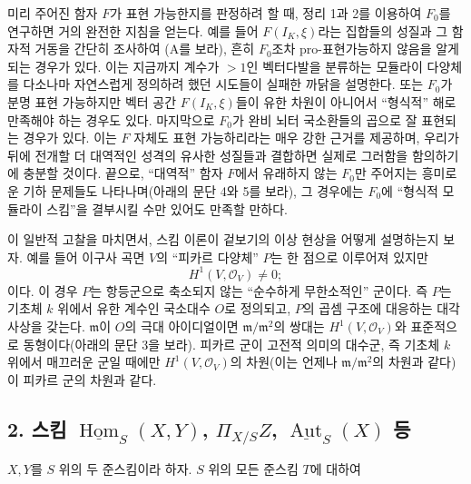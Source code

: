 미리 주어진 함자 $F$가 표현 가능한지를 판정하려 할 때, 정리 1과 2를
이용하여 $F_0$를 연구하면 거의 완전한 지침을 얻는다. 예를 들어
$F(I_K,\xi)$라는 집합들의 성질과 그 함자적 거동을 간단히 조사하여
(A를 보라), 흔히 $F_0$조차 pro-표현가능하지 않음을 알게 되는 경우가
있다. 이는 지금까지 계수가 $>1$인 벡터다발을 분류하는 모듈라이 다양체를
다소나마 자연스럽게 정의하려 했던 시도들이 실패한 까닭을 설명한다.
또는 $F_0$가 분명 표현 가능하지만 벡터 공간 $F(I_K,\xi)$들이 유한
차원이 아니어서 ``형식적'' 해로 만족해야 하는 경우도 있다. 마지막으로
$F_0$가 완비 뇌터 국소환들의 곱으로 잘 표현되는 경우가 있다. 이는 $F$
자체도 표현 가능하리라는 매우 강한 근거를 제공하며, 우리가 뒤에 전개할
더 대역적인 성격의 유사한 성질들과 결합하면 실제로 그러함을 함의하기에
충분할 것이다. 끝으로, ``대역적'' 함자 $F$에서 유래하지 않는 $F_0$만
주어지는 흥미로운 기하 문제들도 나타나며(아래의 문단 4와 5를 보라),
그 경우에는 $F_0$에 ``형식적 모듈라이 스킴''을 결부시킬 수만 있어도
만족할 만하다.

이 일반적 고찰을 마치면서, 스킴 이론이 겉보기의 이상 현상을 어떻게
설명하는지 보자. 예를 들어 이구사 곡면 $V$의 ``피카르 다양체'' $P$는
한 점으로 이루어져 있지만
\[
  H^1(V,\mathcal O_V)\ne 0 ;
\]
이다. 이 경우 $P$는 항등군으로 축소되지 않는 ``순수하게 무한소적인''
군이다. 즉 $P$는 기초체 $k$ 위에서 유한 계수인 국소대수 $O$로 정의되고,
$P$의 곱셈 구조에 대응하는 대각사상을 갖는다. $\mathfrak m$이 $O$의
극대 아이디얼이면 $\mathfrak m/\mathfrak m^2$의 쌍대는
$H^1(V,\mathcal O_V)$와 표준적으로 동형이다(아래의 문단 3을 보라).
피카르 군이 고전적 의미의 대수군, 즉 기초체 $k$ 위에서 매끄러운 군일
때에만 $H^1(V,\mathcal O_V)$의 차원(이는 언제나
$\mathfrak m/\mathfrak m^2$의 차원과 같다)이 피카르 군의 차원과 같다.

\subsection*{2. 스킴 $\underline{\operatorname{Hom}}_S(X,Y)$,
$\Pi_{X/S}Z$, $\underline{\operatorname{Aut}}_S(X)$ 등}

$X,Y$를 $S$ 위의 두 준스킴이라 하자. $S$ 위의 모든 준스킴 $T$에 대하여

